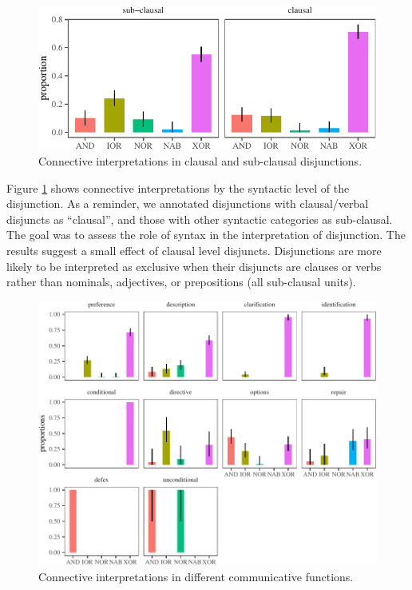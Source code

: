 \documentclass[floatsintext,man]{apa6}
\theoremstyle{definition}
\theoremstyle{definition}
\theoremstyle{definition}
\theoremstyle{remark}
\begin{document}
\begin{figure}[tb]

{\centering \includegraphics{figs/syntaxPlot-1} 

}

\caption{Connective interpretations in clausal and sub-clausal disjunctions.}\label{fig:syntaxPlot}
\end{figure}

Figure \ref{fig:syntaxPlot} shows connective interpretations by the
syntactic level of the disjunction. As a reminder, we annotated
disjunctions with clausal/verbal disjuncts as \enquote{clausal}, and
those with other syntactic categories as sub-clausal. The goal was to
assess the role of syntax in the interpretation of disjunction. The
results suggest a small effect of clausal level disjuncts. Disjunctions
are more likely to be interpreted as exclusive when their disjuncts are
clauses or verbs rather than nominals, adjectives, or prepositions (all
sub-clausal units).

\begin{figure}[tb]

{\centering \includegraphics{figs/speechActPlot-1} 

}

\caption{Connective interpretations in different communicative functions.}\label{fig:speechActPlot}
\end{figure}
\end{document}
